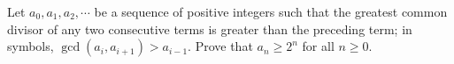 \documentclass{subfile}
\begin{document}
%
%
%
%

	\begin{problem}
		Let $ a_0, a_1, a_2, \cdots$ be a sequence of positive integers such that the greatest common divisor of any two consecutive terms is greater than the preceding term; in symbols, $ \gcd (a_i, a_{i+ 1}) > a_{i - 1}$. Prove that $ a_n\ge 2^n$ for all $ n\ge 0$. %
	\end{problem}
\end{document}
